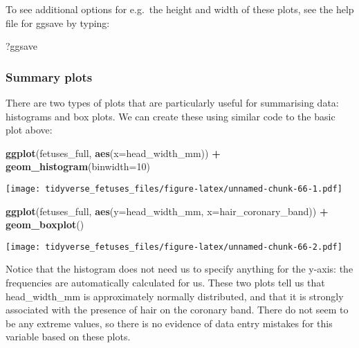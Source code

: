 \documentclass[
]{article}
\newenvironment{Shaded}{\begin{snugshade}}{\end{snugshade}}
\newcommand{\DataTypeTok}[1]{\textcolor[rgb]{0.13,0.29,0.53}{#1}}
\newcommand{\DecValTok}[1]{\textcolor[rgb]{0.00,0.00,0.81}{#1}}
\newcommand{\KeywordTok}[1]{\textcolor[rgb]{0.13,0.29,0.53}{\textbf{#1}}}
\newcommand{\NormalTok}[1]{#1}
\newcommand{\OperatorTok}[1]{\textcolor[rgb]{0.81,0.36,0.00}{\textbf{#1}}}
\newcommand{\StringTok}[1]{\textcolor[rgb]{0.31,0.60,0.02}{#1}}
\begin{document}
To see additional options for e.g.~the height and width of these plots,
see the help file for ggsave by typing:

\begin{Shaded}
\begin{Highlighting}[]
\NormalTok{?ggsave}
\end{Highlighting}
\end{Shaded}

\hypertarget{summary-plots}{%
\subsubsection{Summary plots}\label{summary-plots}}

There are two types of plots that are particularly useful for
summarising data: histograms and box plots. We can create these using
similar code to the basic plot above:

\begin{Shaded}
\begin{Highlighting}[]
\KeywordTok{ggplot}\NormalTok{(fetuses_full, }\KeywordTok{aes}\NormalTok{(}\DataTypeTok{x=}\NormalTok{head_width_mm)) }\OperatorTok{+}
\StringTok{    }\KeywordTok{geom_histogram}\NormalTok{(}\DataTypeTok{binwidth=}\DecValTok{10}\NormalTok{)}
\end{Highlighting}
\end{Shaded}

\texttt{[image: tidyverse\_fetuses\_files/figure-latex/unnamed-chunk-66-1.pdf]}

\begin{Shaded}
\begin{Highlighting}[]
\KeywordTok{ggplot}\NormalTok{(fetuses_full, }\KeywordTok{aes}\NormalTok{(}\DataTypeTok{y=}\NormalTok{head_width_mm, }\DataTypeTok{x=}\NormalTok{hair_coronary_band)) }\OperatorTok{+}
\StringTok{    }\KeywordTok{geom_boxplot}\NormalTok{()}
\end{Highlighting}
\end{Shaded}

\texttt{[image: tidyverse\_fetuses\_files/figure-latex/unnamed-chunk-66-2.pdf]}

Notice that the histogram does not need us to specify anything for the
y-axis: the frequencies are automatically calculated for us. These two
plots tell us that head\_width\_mm is approximately normally
distributed, and that it is strongly associated with the presence of
hair on the coronary band. There do not seem to be any extreme values,
so there is no evidence of data entry mistakes for this variable based
on these plots.
\end{document}
